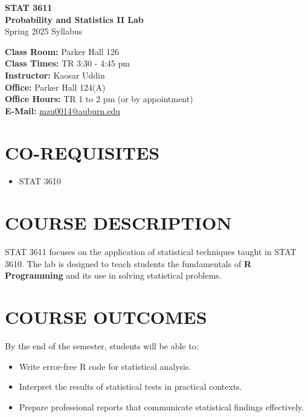 \documentclass[12pt]{article}
\begin{document}
\begin{center}
    \Huge \textbf{STAT 3611} \\
    \LARGE \textbf{Probability and Statistics II Lab} \\
    \Large Spring 2025 Syllabus
\end{center}

\vspace{1em}

\noindent
\textbf{Class Room:} Parker Hall 126 \\
\textbf{Class Times:} TR 3:30 - 4:45 pm \\

\noindent
\textbf{Instructor:} Kaosar Uddin \\
\textbf{Office:} Parker Hall 124(A) \\
\textbf{Office Hours:} TR 1 to 2 pm (or by appointment) \\
\textbf{E-Mail:} \href{mailto:mzu0014@auburn.edu}{mzu0014@auburn.edu} \\

\section*{CO-REQUISITES}
\begin{itemize}
    \item STAT 3610
\end{itemize}

\section*{COURSE DESCRIPTION}
STAT 3611 focuses on the application of statistical techniques taught in STAT 3610. The lab is designed to teach students the fundamentals of \textbf{R Programming} and its use in solving statistical problems.

\section*{COURSE OUTCOMES}
By the end of the semester, students will be able to:
\begin{itemize}
    \item Write error-free R code for statistical analysis.
    \item Interpret the results of statistical tests in practical contexts.
    \item Prepare professional reports that communicate statistical findings effectively.
\end{itemize}
\end{document}
